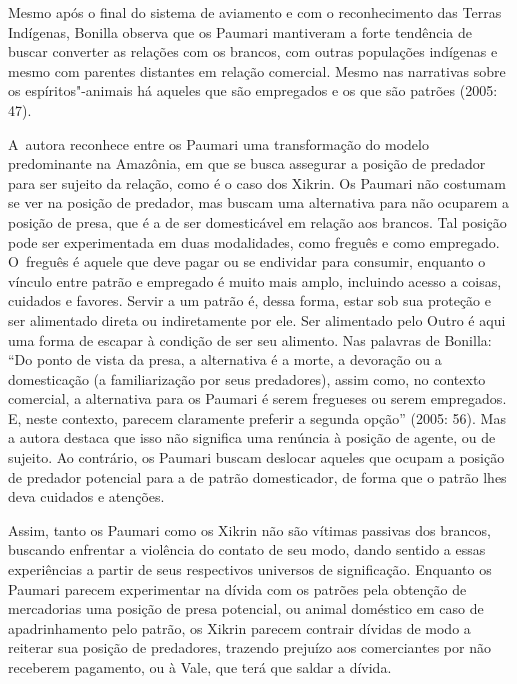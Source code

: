 Mesmo após o final do sistema de aviamento e com o reconhecimento das
Terras Indígenas, Bonilla observa que os Paumari mantiveram a forte
tendência de buscar converter as relações com os brancos, com outras
populações indígenas e mesmo com parentes distantes em relação
comercial. Mesmo nas narrativas sobre os espíritos"-animais há aqueles
que são empregados e os que são patrões (2005: 47).

A~autora reconhece entre os Paumari uma transformação do modelo
predominante na Amazônia, em que se busca assegurar a posição de
predador para ser sujeito da relação, como é o caso dos Xikrin. Os
Paumari não costumam se ver na posição de predador, mas buscam uma
alternativa para não ocuparem a posição de presa, que é a de ser
domesticável em relação aos brancos. Tal posição pode ser experimentada
em duas modalidades, como freguês e como empregado. O~freguês é aquele
que deve pagar ou se endividar para consumir, enquanto o vínculo entre
patrão e empregado é muito mais amplo, incluindo acesso a coisas,
cuidados e favores. Servir a um patrão é, dessa forma, estar sob sua proteção e
ser alimentado direta ou indiretamente por ele. Ser alimentado pelo
Outro é aqui uma forma de escapar à condição de ser seu alimento. Nas
palavras de Bonilla: ``Do ponto de vista da presa, a alternativa é a
morte, a devoração ou a domesticação (a familiarização por seus
predadores), assim como, no contexto comercial, a alternativa para os
Paumari é serem fregueses ou serem empregados. E, neste contexto,
parecem claramente preferir a segunda opção'' (2005: 56). Mas a autora
destaca que isso não significa uma renúncia à posição de agente, ou de
sujeito. Ao contrário, os Paumari buscam deslocar aqueles que ocupam a
posição de predador potencial para a de patrão domesticador, de forma
que o patrão lhes deva cuidados e atenções. 

Assim, tanto os Paumari como os Xikrin não são vítimas passivas dos
brancos, buscando enfrentar a violência do contato de seu modo, dando
sentido a essas experiências a partir de seus respectivos universos de
significação. Enquanto os Paumari parecem experimentar na dívida com os
patrões pela obtenção de mercadorias uma posição de presa potencial, ou
animal doméstico em caso de apadrinhamento pelo patrão, os Xikrin
parecem contrair dívidas de modo a reiterar sua posição de predadores,
trazendo prejuízo aos comerciantes por não receberem pagamento, ou à
Vale, que terá que saldar a dívida.

